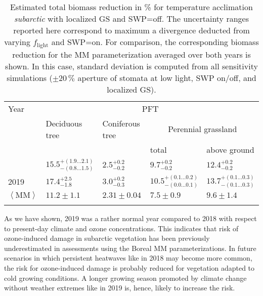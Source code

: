\documentclass[bg, manuscript]{copernicus}
\begin{document}
\begin{table}[t]
  \caption{Estimated total biomass reduction in \unit{\%} for temperature acclimation \emph{subarctic} with localized GS and SWP=off. The uncertainty ranges reported here correspond to maximum a divergence deducted from varying $f_\mathrm{light}$ and SWP=on. For comparison, the corresponding biomass reduction for the MM parameterization averaged over both years is shown. In this case, standard deviation is computed from all sensitivity simulations ($\pm 20\,\unit{\%}$ aperture of stomata at low light, SWP on/off, and localized GS).}
  \label{tab:biomass_reduction}
\begin{tabular}{lllll}
\tophline
Year & \multicolumn{4}{c}{PFT}\\
& Deciduous tree& Coniferous tree & \multicolumn{2}{c}{Perennial grassland}\\
& & & total & above ground\\
\middlehline
2018 & $15.5^{+(1.9...2.1)}_{-(0.8...1.5)}$ & $2.5^{+0.2}_{-0.2}$ & $9.7^{+0.2}_{-0.2}$ & $12.4^{+0.2}_{-0.2}$\\
2019 & $17.4^{+2.5}_{-1.8}$ & $3.0^{+0.2}_{-0.3}$ & $10.5^{+(0.1...0.2)}_{-(0.0...0.1)}$ & $13.7^{+(0.1...0.3)}_{-(0.1...0.3)}$\\
\middlehline
$\left<\mathrm{MM}\right>$ & $11.2\pm 1.1$ & $2.31\pm 0.04$ & $7.5\pm 0.9$ & $9.6\pm 1.4$\\
\bottomhline
\end{tabular}
\end{table}

As we have shown, 2019 was a rather normal year compared to 2018 with respect to present-day climate and ozone concentrations. This indicates that risk of ozone-induced damage in subarctic vegetation has been previously underestimated in assessments using the Boreal MM parameterizations. In future scenarios in which persistent heatwaves like in 2018 may become more common, the risk for ozone-induced damage is probably reduced for vegetation adapted to cold growing conditions. A longer growing season promoted by climate change without weather extremes like in 2019 is, hence, likely to increase the risk.

\label{sec:conc}
\end{document}
